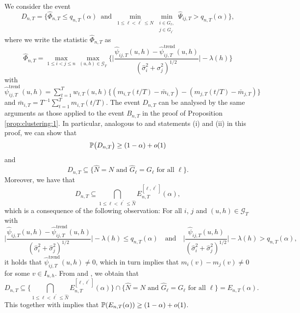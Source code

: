 \documentclass[12pt]{article}
\makeatletter
\renewcommand{\eqref}[1]{\tagform@{\ref{#1}}}
\makeatother
\begin{document}
We consider the event
\[ D_{n,T} = \Big\{ \widehat{\Phi}_{n,T} \le q_{n,T}(\alpha) \, \text{ and } \,  \min_{1 \le \ell < \ell^\prime \le N} \min_{\substack{i \in G_\ell, \\ j \in G_{\ell^\prime}}} \widehat{\Psi}_{ij,T} > q_{n,T}(\alpha) \Big\}, \]
where we write the statistic $\widehat{\Phi}_{n,T}$ as
\[ \widehat{\Phi}_{n,T} = \max_{1 \le i < j \le n} \max_{(u,h) \in \mathcal{G}_T} \Big\{ \Big| \frac{\widehat{\psi}_{ij,T}(u,h)- \widehat{\psi}_{ij,T}^{\text{trend}}(u,h)} {(\widehat{\sigma}_i^2 + \widehat{\sigma}_j^2)^{1/2}} \Big| - \lambda(h) \Big \} \]
with $\widehat{\psi}_{ij,T}^{\text{trend}}(u,h) = \sum_{t=1}^T w_{t,T}(u,h) \{ (m_{i,T}(t/T) - \bar{m}_{i,T}) - (m_{j,T}(t/T) - \bar{m}_{j,T}) \}$ and $\bar{m}_{i,T} = T^{-1} \sum_{t=1}^T m_{i,T}(t/T)$. The event $D_{n,T}$ can be analysed by the same arguments as those applied to the event $B_{n,T}$ in the proof of Proposition \ref{prop:clustering:1}. In particular, analogous to \eqref{eq2-prop-clustering-1} and statements (i) and (ii) in this proof, we can show that
\begin{equation}\label{eq1-prop-clustering-2}
\mathbb{P} \big( D_{n,T} \big) \ge (1-\alpha) + o(1)
\end{equation}
and 
\begin{equation}\label{eq2-prop-clustering-2}
D_{n,T} \subseteq \big\{ \widehat{N} = N \text{ and } \widehat{G}_\ell = G_\ell \text{ for all } \ell \big\}.
\end{equation}
Moreover, we have that
\begin{equation}\label{eq3-prop-clustering-2}
D_{n,T} \subseteq \bigcap_{1 \le \ell < \ell^\prime \le \widehat{N}} E_{n,T}^{[\ell,\ell^\prime]}(\alpha),
\end{equation}
which is a consequence of the following observation: For all $i$, $j$ and $(u,h) \in \mathcal{G}_T$ with 
\[ \Big|\frac{\widehat{\psi}_{ij,T}(u,h) - \widehat{\psi}_{ij,T}^{\text{trend}}(u,h)}{(\widehat{\sigma}_i^2 + \widehat{\sigma}_j^2)^{1/2}}\Big| - \lambda(h) \le q_{n,T}(\alpha) \quad \text{and} \quad \Big|\frac{\widehat{\psi}_{ij,T}(u,h)}{(\widehat{\sigma}_i^2 + \widehat{\sigma}_j^2)^{1/2}}\Big| - \lambda(h) > q_{n,T}(\alpha), \]
it holds that $\widehat{\psi}_{ij,T}^{\text{trend}}(u,h) \ne 0$, which in turn implies that $m_i(v) - m_j(v) \ne 0$ for some $v \in I_{u,h}$. From \eqref{eq2-prop-clustering-2} and \eqref{eq3-prop-clustering-2}, we obtain that 
\[ D_{n,T} \subseteq \Big\{ \bigcap_{1 \le \ell < \ell^\prime \le \widehat{N}} E_{n,T}^{[\ell,\ell^\prime]}(\alpha) \Big\} \cap \big\{ \widehat{N} = N \text{ and } \widehat{G}_\ell = G_\ell \text{ for all } \ell \big\} = E_{n,T}(\alpha). \] 
This together with \eqref{eq1-prop-clustering-2} implies that $\mathbb{P}(E_{n,T}(\alpha)) \ge (1-\alpha) + o(1)$. 




{\small
\setlength{\bibsep}{0.55em}
}
\end{document}
